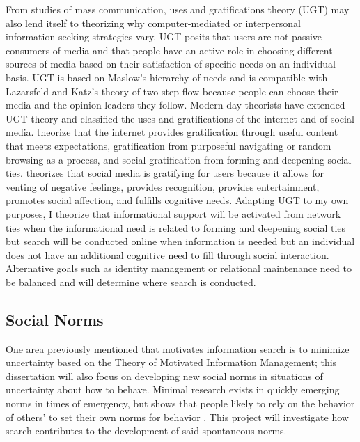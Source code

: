 From studies of mass communication, uses and gratifications theory (UGT)
\citep{blumlerUsesMassCommunications1974, tanMassCommunicationTheories1985}
may also lend itself to theorizing why
computer-mediated or interpersonal information-seeking strategies vary.
UGT posits that users are not passive consumers of media and that people
have an active role in choosing different sources of media based on
their satisfaction of specific needs on an individual basis. UGT is
based on Maslow's \citeyearpar{maslowTheoryHumanMotivation1943}
hierarchy of needs and is compatible with
Lazarsfeld and Katz's theory of two-step flow because people can choose
their media and the opinion leaders they follow. Modern-day theorists
have extended UGT theory and classified the uses and gratifications of
the internet and of social media. \citet{staffordDeterminingUsesGratifications2004}
theorize that the internet provides gratification through useful content
that meets expectations, gratification from purposeful navigating or
random browsing as a process, and social gratification from forming and
deepening social ties. \citet{leungGenerationalDifferencesContent2013} theorizes that 
social media is
gratifying for users because it allows for venting of negative feelings,
provides recognition, provides entertainment, promotes social affection,
and fulfills cognitive needs. Adapting UGT to my own purposes, I
theorize that informational support will be activated from network ties
when the informational need is related to forming and deepening social
ties but search will be conducted online when information is needed but
an individual does not have an additional cognitive need to fill through
social interaction. Alternative goals such as identity management or
relational maintenance \citep{brashersInformationSeekingAvoiding2002}
need to be balanced and will determine where search is conducted.

\subsection{Social Norms}

One area previously mentioned that motivates information search is to
minimize uncertainty based on the Theory of Motivated Information
Management; this dissertation will also focus on developing new social
norms in situations of uncertainty about how to behave. Minimal research
exists in quickly emerging norms in times of emergency, but shows that
people likely to rely on the behavior of others' to set their own norms
for behavior \citep{alvarez2018, horneNormsIntegratedFramework2020}. This project will investigate how search contributes to the
development of said spontaneous norms.

